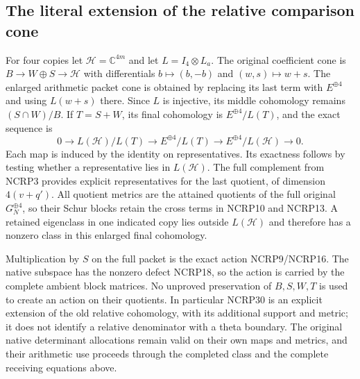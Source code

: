 \subsection{The literal extension of the relative comparison cone}

For four copies let $\mathcal H=\mathbb C^{4m}$ and let
$L=I_4\otimes L_a$. The original coefficient cone is
$B\to W\oplus S\to\mathcal H$ with differentials
$b\mapsto(b,-b)$ and $(w,s)\mapsto w+s$.
The enlarged arithmetic packet cone is obtained by replacing its
last term with $E^{\oplus4}$ and using $L(w+s)$ there.
Since $L$ is injective, its middle cohomology remains
$(S\cap W)/B$. If $T=S+W$, its final cohomology is
$E^{\oplus4}/L(T)$, and the exact sequence is
\[
 0\longrightarrow L(\mathcal H)/L(T)
 \longrightarrow E^{\oplus4}/L(T)
 \longrightarrow E^{\oplus4}/L(\mathcal H)
 \longrightarrow0.
 \tag{NCRP30}
\]
Each map is induced by the identity on representatives. Its exactness
follows by testing whether a representative lies in $L(\mathcal H)$.
The full complement from NCRP3 provides explicit representatives for
the last quotient, of dimension $4(v+q')$.
All quotient metrics are the attained quotients of the full original
$G_N^{\oplus4}$, so their Schur blocks retain the cross terms in
NCRP10 and NCRP13. A retained eigenclass in one indicated copy lies
outside $L(\mathcal H)$ and therefore has a nonzero class in this
enlarged final cohomology.

Multiplication by $S$ on the full packet is the exact action
NCRP9/NCRP16. The native subspace has the nonzero defect NCRP18,
so the action is carried by the complete ambient block matrices.
No unproved preservation of $B,S,W,T$ is used to create an action
on their quotients. In particular NCRP30 is an explicit extension
of the old relative cohomology, with its additional support and
metric; it does not identify a relative denominator with a theta
boundary. The original native determinant allocations remain valid
on their own maps and metrics, and their arithmetic use proceeds
through the completed class and the complete receiving equations above.
